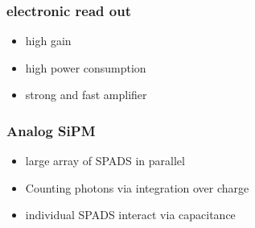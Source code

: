 \documentclass{beamer}
\begin{document}
\begin{frame}
  \frametitle{electronic read out}
  \begin{itemize}
    \item high gain
    \item high power consumption
    \item strong and fast amplifier
  \end{itemize}
\end{frame}

\begin{frame}
  \frametitle{Analog SiPM}
  \begin{itemize}
    \item large array of SPADS in parallel
    \item Counting photons via integration over charge
    \item individual SPADS interact via capacitance
  \end{itemize}
\end{frame}
\end{document}
